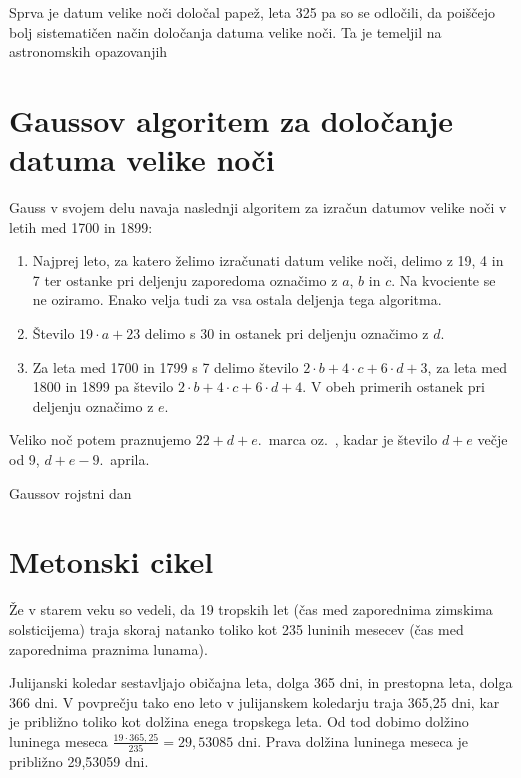 Sprva je datum velike noči določal papež, leta 325 pa so se odločili, da 
poiščejo bolj sistematičen način določanja datuma velike noči. Ta je 
temeljil na astronomskih opazovanjih



\section{Gaussov algoritem za določanje datuma velike noči}

Gauss v svojem delu navaja naslednji algoritem za izračun datumov velike noči v
letih med 1700 in 1899:
\begin{enumerate}
   \item Najprej leto, za katero želimo izračunati datum velike noči, delimo z
      19, 4 in 7 ter ostanke pri deljenju zaporedoma označimo z $a$, $b$ in $c$.
      Na kvociente se ne oziramo. Enako velja tudi za vsa ostala deljenja tega
      algoritma.
   \item Število $19 \cdot a + 23$ delimo s 30 in ostanek pri deljenju označimo z $d$.
   \item Za leta med 1700 in 1799 s 7 delimo število $2 \cdot b + 4 \cdot c + 6 \cdot d + 3$,
      za leta med 1800 in 1899 pa število $2 \cdot b + 4 \cdot c + 6 \cdot d + 4$. 
      V obeh primerih ostanek pri deljenju označimo z $e$.
\end{enumerate}
Veliko noč potem praznujemo $22 + d + e$.\ marca oz.\ , kadar je število $d + e$ 
večje od 9, $d + e - 9$.\ aprila.

\begin{zgled}
   Gaussov rojstni dan
\end{zgled}




\section{Metonski cikel}

Že v starem veku so vedeli, da 19 tropskih let (čas med zaporednima
zimskima solsticijema) traja skoraj natanko toliko kot 235 luninih mesecev 
(čas med zaporednima praznima lunama). 

Julijanski koledar sestavljajo običajna leta, dolga 365 dni, in prestopna
leta, dolga 366 dni. V povprečju tako eno leto v julijanskem koledarju traja
365,25 dni, kar je približno toliko kot dolžina enega tropskega leta. Od tod 
dobimo dolžino luninega meseca $\frac{19 \cdot 365,25}{235} = 29,53085$ dni.
Prava dolžina luninega meseca je približno 29,53059 dni.

